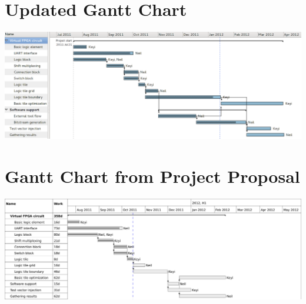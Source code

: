 
\section{Updated Gantt Chart}
\label{new-gantt-chart}

\includegraphics[scale=0.45,angle=90]{gantt.png}


\pagebreak


\section{Gantt Chart from Project Proposal}
\label{old-gantt-chart}

\includegraphics[scale=1.0,angle=90]{old-gantt.png}

